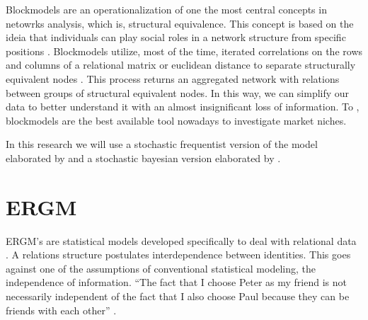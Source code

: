 \documentclass[a4paper, 12pt, openright, oneside, german, french, brazil, english]{abntex2}
\begin{document}
        Blockmodels are an operationalization of one the most central concepts in netowrks analysis, which is, structural equivalence. This concept is based on the ideia that individuals can play social roles in a network structure from specific positions \cite{lazega2014redes}. Blockmodels utilize, most of the time, iterated correlations on the rows and columns of a relational matrix or euclidean distance to separate structurally equivalent nodes \cite{wasserman1994social}. This process returns an aggregated network with relations between groups of structural equivalent nodes. In this way, we can simplify our data to better understand it with an almost insignificant loss of information. To , blockmodels are the best available tool nowadays to investigate market niches.
	
	
	In this research we will use a stochastic frequentist version of the model elaborated by  and a stochastic bayesian version elaborated by .
	
	
	\section{ERGM}
	
	
	ERGM's are statistical models developed specifically to deal with relational data \cite{robins2007introduction,lusher2013exponential}. A relations structure postulates interdependence between identities. This goes against one of the assumptions of conventional statistical modeling, the independence of information. ``The fact that I choose Peter as my friend is not necessarily independent of the fact that I also choose Paul because they can be friends with each other'' \cite[p. 76]{lazega2014redes}.
	
\end{document}
